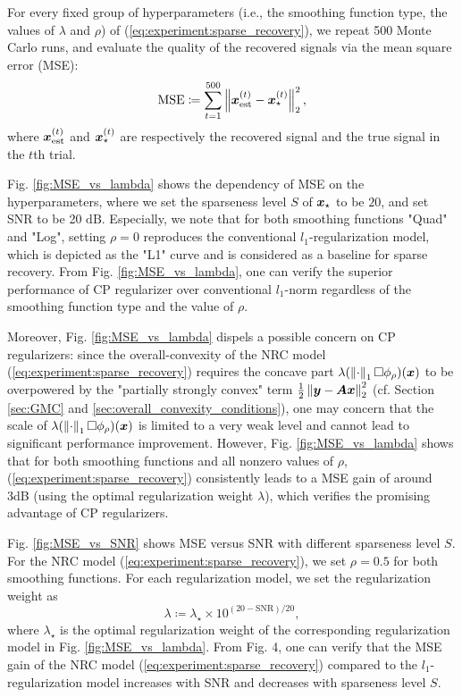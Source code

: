 \documentclass[lettersize,journal]{IEEEtran}
\theoremstyle{plain}%
\theoremstyle{definition}
\theoremstyle{remark}
\begin{document}
For every fixed group of hyperparameters (i.e., the smoothing function type, the values of $\lambda$ and $\rho$) of (\ref{eq:experiment:sparse_recovery}), we repeat 500 Monte Carlo runs, and evaluate the quality of the recovered signals via the mean square error (MSE):
\begin{equation*}
\mathrm{MSE}\coloneqq \sum_{t=1}^{500}\left\| \bm{x}_\mathrm{est}^{(t)}-\bm{x}_\star^{(t)} \right\|^2_2,
\end{equation*}
where $\bm{x}_\mathrm{est}^{(t)}$ and $\bm{x}_\star^{(t)}$ are respectively the recovered signal and the true signal in the $t$th trial.

Fig. \ref{fig:MSE_vs_lambda} shows the dependency of MSE on the hyperparameters, where we set the sparseness level $S$ of $\bm{x}_{\star}$ to be $20$, and set SNR to be 20 $\mathrm{dB}$. Especially, we note that for both smoothing functions "Quad" and "Log", setting $\rho=0$ reproduces the conventional $l_1$-regularization model, which is depicted as the "L1" curve and is considered as a baseline for sparse recovery. From Fig. \ref{fig:MSE_vs_lambda}, one can verify the superior performance of CP regularizer over conventional $l_1$-norm regardless of the smoothing function type and the value of $\rho$. 

Moreover, Fig. \ref{fig:MSE_vs_lambda} dispels a possible concern on CP regularizers: since the overall-convexity of the NRC model (\ref{eq:experiment:sparse_recovery}) requires the concave part $\lambda(\left\| \cdot \right\|_1\Box\phi_{\rho})(\bm{x})$ to be overpowered by the "partially strongly convex" term $\frac{1}{2}\left\| \bm{y}-\bm{A}\bm{x} \right\|^2_2$ (cf. Section \ref{sec:GMC} and \ref{sec:overall_convexity_conditions}), one may concern that the scale of $\lambda(\left\| \cdot \right\|_1\Box\phi_{\rho})(\bm{x})$ is limited to a very weak level and cannot lead to significant performance improvement. However, Fig. \ref{fig:MSE_vs_lambda} shows that for both smoothing functions and all nonzero values of $\rho$, (\ref{eq:experiment:sparse_recovery}) consistently leads to a MSE gain of around 3dB (using the optimal regularization weight $\lambda$), which verifies the promising advantage of CP regularizers.

Fig. \ref{fig:MSE_vs_SNR} shows MSE versus SNR with different sparseness level $S$. For the NRC model (\ref{eq:experiment:sparse_recovery}), we set $\rho=0.5$ for both smoothing functions. For each regularization model, we set the regularization weight as
\begin{equation*}
\lambda\coloneqq \lambda_\star\times 10^{(20-\mathrm{SNR})/20},
\end{equation*}
where $\lambda_\star$ is the optimal regularization weight of the corresponding regularization model in Fig. \ref{fig:MSE_vs_lambda}. From Fig. 4, one can verify that the MSE gain of the NRC model (\ref{eq:experiment:sparse_recovery}) compared to the $l_1$-regularization model increases with SNR and decreases with sparseness level $S$.
\end{document}
